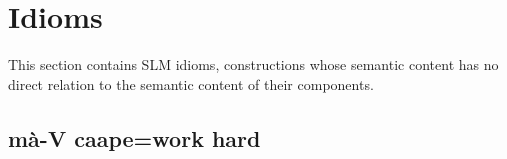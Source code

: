 % 

 

 
%  
\section{Idioms}\label{sec:constr:Idioms}
This section contains SLM idioms, constructions whose semantic content has no direct relation to the semantic content of their components.

\subsection{mà-V caape=work hard}\label{sec:constr:mà-Vcaape=workhard}

 \\

